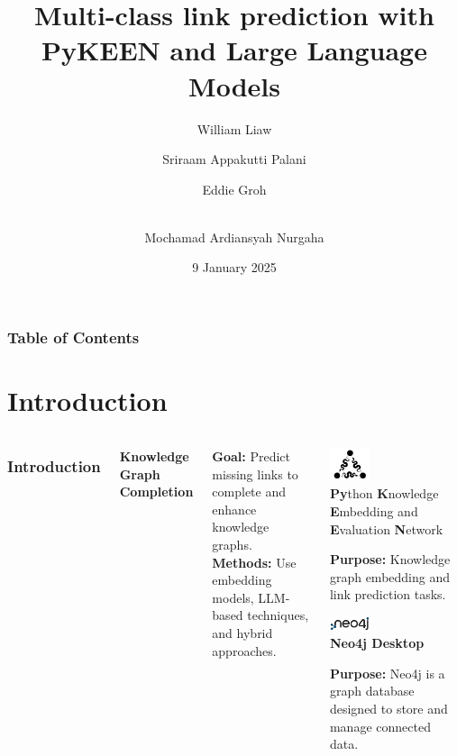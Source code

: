 \documentclass{beamer}
\title[Mid-Term Presentation]
{Multi-class link prediction with PyKEEN and Large Language Models}
\author[] %
{William Liaw \and Sriraam Appakutti Palani  \and Eddie Groh\and \\Mochamad Ardiansyah Nurgaha}
\institute[Team: AWESome] %
{%
  Mehwish ALAM\\
  Associate Professor
  \and
  Language Models and Structured Data\\
}
\date[9 January 2025] %
{9 January 2025}
\begin{document}
\frame{\titlepage}
\begin{frame}
    \frametitle{Table of Contents}
    \tableofcontents
\end{frame}

\section{Introduction}
\begin{frame}
    \begin{columns}
        \frametitle{Introduction}

        \begin{minipage}{\dimexpr\textwidth-2\fboxsep}
            \begin{center}
                \textbf{Knowledge Graph Completion} \\[1em]
            \end{center}
            \small \textbf{Goal:} Predict missing links to complete and enhance knowledge graphs. \\[0.5em]
            \small \textbf{Methods:} Use embedding models, LLM-based techniques, and hybrid approaches.
        \end{minipage}

        \colorbox{blue!10}{
            \begin{minipage}{\dimexpr\textwidth-2\fboxsep}
                \begin{center}
                    \includegraphics[width=0.3\textwidth]{images/pykeen-logo} \\
                    \textbf{Py}thon \textbf{K}nowledge \textbf{E}mbedding and \textbf{E}valuation \textbf{N}etwork \\[1em]
                \end{center}
                \small \textbf{Purpose:} Knowledge graph embedding and link prediction tasks. \\[1.2em]

                \begin{center}
                    \includegraphics[width=0.3\textwidth]{images/neo4j-logo} \\
                    \textbf{Neo4j Desktop} \\[1em]
                \end{center}
                \small \textbf{Purpose:} Neo4j is a graph database designed to store and manage connected data.
            \end{minipage}
        }
    \end{columns}
\end{frame}
\end{document}
